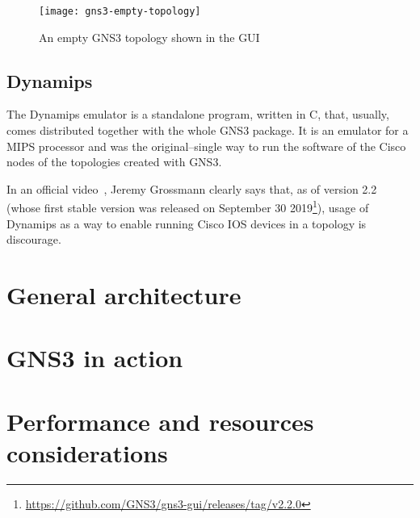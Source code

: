 \begin{figure}
  \centering
  \texttt{[image: gns3-empty-topology]}
  \caption{An empty GNS3 topology shown in the GUI}
  \label{fig:gns3-empty-topology}
\end{figure}

\subsection{Dynamips}
\label{subsec:gns3dynamips}

The Dynamips emulator is a standalone program, written in C, that, usually, comes distributed together with the whole GNS3 package.
It is an emulator for a MIPS processor and was the original--single way to run the software of the Cisco nodes of the topologies created with GNS3.

In an official video~\cite{ytdynamipsvpcs}, Jeremy Grossmann clearly says that, as of version 2.2 (whose first stable version was released on September 30 2019\footnote{\url{https://github.com/GNS3/gns3-gui/releases/tag/v2.2.0}}), usage of Dynamips as a way to enable running Cisco IOS devices in a topology is discourage.


\section{General architecture}
\label{sec:gns3architecture}


\section{GNS3 in action}
\label{sec:gns3inaction}


\section{Performance and resources considerations}
\label{sec:gns3performance}


